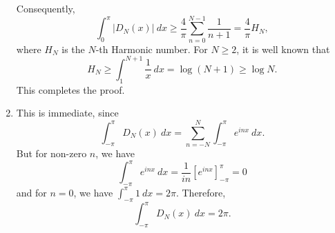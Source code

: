\documentclass[12pt]{amsart}
\begin{document}
\begin{enumerate}[label=(\alph*)]
    Consequently, 
    \begin{equation*}
        \int_{0}^{\pi} |D_N(x)|~dx\ge\frac{4}{\pi}\sum_{n = 0}^{N - 1}\frac{1}{n + 1} = \frac{4}{\pi}H_N,
    \end{equation*}
    where $H_N$ is the $N$-th Harmonic number. For $N\ge 2$, it is well known that 
    \begin{equation*}
        H_N\ge\int_{1}^{N + 1}\frac{1}{x}~dx = \log(N + 1)\ge\log N.
    \end{equation*}
    This completes the proof.

    \item This is immediate, since 
    \begin{equation*}
        \int_{-\pi}^{\pi}D_N(x)~dx = \sum_{n = -N}^{N}\int_{-\pi}^{\pi}e^{inx}~dx.
    \end{equation*}
    But for non-zero $n$, we have 
    \begin{equation*}
        \int_{-\pi}^{\pi}e^{inx}~dx = \frac{1}{in}\left[e^{inx}\right]_{-\pi}^{\pi} = 0
    \end{equation*}
    and for $n = 0$, we have $\int_{-\pi}^{\pi}1~dx = 2\pi$. Therefore, 
    \begin{equation*}
        \int_{-\pi}^{\pi}D_N(x)~dx = 2\pi.
    \end{equation*}
\end{enumerate}
\end{document}
